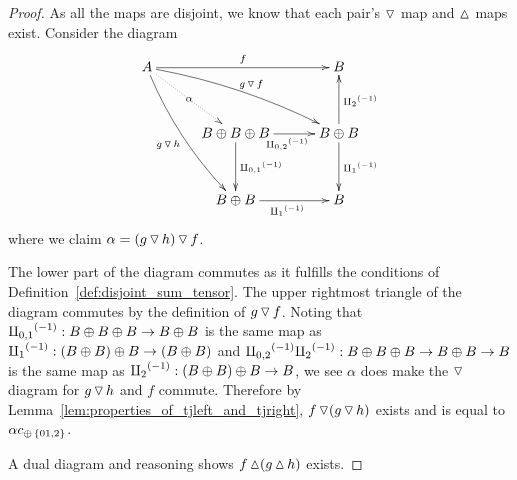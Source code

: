 \begin{proof}
  As all the maps are disjoint, we know that each pair's $\operatorname{\triangledown}$ map and $\operatorname{\vartriangle}$ maps
  exist.  Consider the diagram
  \[
    \xymatrix@C+5pt@R+10pt{
      A \ar@/_/[ddr]_{g\tjleft h} \ar@/^/[drr]^{g\tjleft f} \ar@{.>}[dr]|-{\alpha} \ar[rr]^{f}
        & & B \\
        & B\+B\+B \ar[d]^{\icp{0,1}} \ar[r]_{\icp{0,2}} & B\+B \ar[d]^{\icpa} \ar[u]_{\icpb} \\
        & B\+B \ar[r]_{\icpa} & B
    }
  \]
  where we claim $\alpha = (g\operatorname{\triangledown} h)\operatorname{\triangledown} f$.

  The lower part of the diagram commutes as it fulfills the conditions of
  Definition~\ref{def:disjoint_sum_tensor}. The upper rightmost triangle of the diagram commutes by
  the definition of $g\operatorname{\triangledown} f$. Noting that ${\amalg_{0,1}}^{(-1)}:B\oplus B\oplus B \to B\oplus B$ is the same map as
  ${\amalg_{1}}^{(-1)}:(B\oplus B)\oplus B\to (B\oplus B)$ and ${\amalg_{0,2}}^{(-1)} {\amalg_{2}}^{(-1)}:B\oplus B\oplus B \to B\oplus B \to B$ is the same map as
  ${\amalg_{2}}^{(-1)}:(B\oplus B)\oplus B\to B$, we see $\alpha$ does make the $\operatorname{\triangledown}$ diagram for $g\operatorname{\triangledown} h$ and $f$
  commute. Therefore by Lemma~\ref{lem:properties_of_tjleft_and_tjright}, $f\operatorname{\triangledown}(g\operatorname{\triangledown} h)$
  exists and is equal to $\alpha c_{\oplus\,\{01,2\}}$.

  A dual diagram and reasoning shows $f\operatorname{\vartriangle}(g\operatorname{\vartriangle} h)$ exists.
\end{proof}

